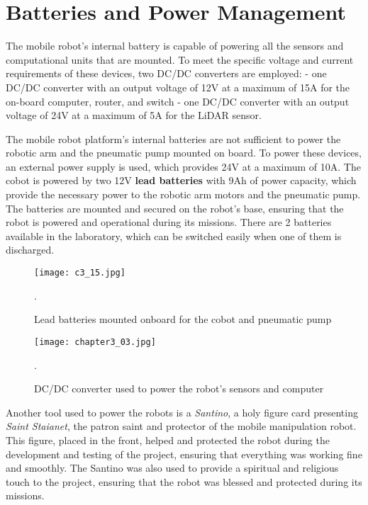 \section{Batteries and Power Management}

The mobile robot's internal battery is capable of powering all the sensors and computational
units that are mounted. To meet the specific voltage and current requirements of these devices, 
two DC/DC converters are employed:
- one DC/DC converter with an output voltage of 12V at a maximum of 15A for the on-board computer, router, and switch
- one DC/DC converter with an output voltage of 24V at a maximum of 5A for the LiDAR sensor.

The mobile robot platform's internal batteries are not sufficient to power the robotic arm and the pneumatic pump
mounted on board. To power these devices, an external power supply is used, which provides 24V at a maximum of 10A.
The cobot is powered by two 12V \textbf{lead batteries} with 9Ah of power capacity, which provide the necessary power 
to the robotic arm motors and the pneumatic pump. The batteries are mounted and secured on the robot's base,
ensuring that the robot is powered and operational during its missions. There are 2 batteries available
in the laboratory, which can be switched easily when one of them is discharged.

\begin{figure}[t]
    \centering
    \texttt{[image: c3\_15.jpg]}
    \captionsetup{width=1\linewidth}
    \caption{Lead batteries mounted onboard for the cobot and pneumatic pump}.
    \label{fig:c3_img15}
\end{figure}

\begin{figure}[t]
    \centering
    \texttt{[image: chapter3\_03.jpg]}
    \captionsetup{width=1\linewidth}
    \caption{DC/DC converter used to power the robot's sensors and computer}.
    \label{fig:c3_img03}
\end{figure}

Another tool used to power the robots is a \textit{Santino}, a holy figure card presenting \textit{Saint Staianet}, 
the patron saint and protector of the mobile manipulation robot. This figure, placed in the front,
helped and protected the robot during the development and testing of the project, ensuring that everything
was working fine and smoothly. The Santino was also used to provide a spiritual and religious touch to the project,
ensuring that the robot was blessed and protected during its missions.

